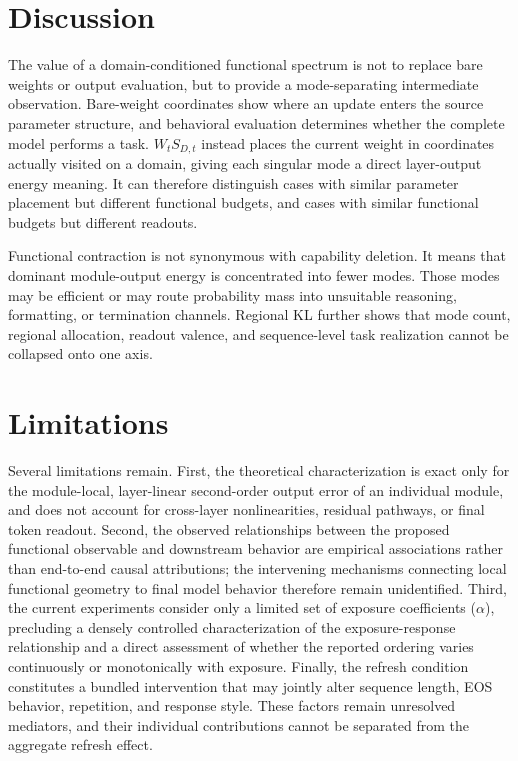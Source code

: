 \documentclass[letterpaper]{article} %
\begin{document}


\section{Discussion}

The value of a domain-conditioned functional spectrum is not to replace bare weights or output evaluation, but to provide a mode-separating intermediate observation. Bare-weight coordinates show where an update enters the source parameter structure, and behavioral evaluation determines whether the complete model performs a task. $W_tS_{D,t}$ instead places the current weight in coordinates actually visited on a domain, giving each singular mode a direct layer-output energy meaning. It can therefore distinguish cases with similar parameter placement but different functional budgets, and cases with similar functional budgets but different readouts.

Functional contraction is not synonymous with capability deletion. It means that
dominant module-output energy is concentrated into fewer modes. Those modes may be
efficient or may route probability mass into unsuitable reasoning, formatting, or
termination channels. Regional KL further shows that mode count, regional allocation,
readout valence, and sequence-level task realization cannot be collapsed onto one axis.

\section{Limitations}

Several limitations remain. First, the theoretical characterization is exact only for the module-local, layer-linear second-order output error of an individual module, and does not account for cross-layer nonlinearities, residual pathways, or final token readout. Second, the observed relationships between the proposed functional observable and downstream behavior are empirical associations rather than end-to-end causal attributions; the intervening mechanisms connecting local functional geometry to final model behavior therefore remain unidentified. Third, the current experiments consider only a limited set of exposure coefficients ($\alpha$), precluding a densely controlled characterization of the exposure-response relationship and a direct assessment of whether the reported ordering varies continuously or monotonically with exposure. Finally, the refresh condition constitutes a bundled intervention that may jointly alter sequence length, EOS behavior, repetition, and response style. These factors remain unresolved mediators, and their individual contributions cannot be separated from the aggregate refresh effect.
\end{document}
